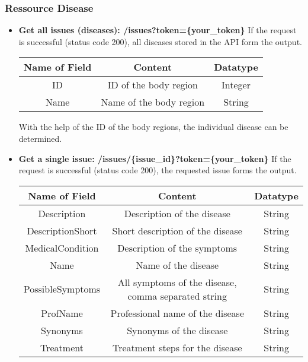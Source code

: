 \subsubsection{Ressource Disease}
\begin{itemize}
	\item \textbf{Get all issues (diseases):  /issues?token=\{your\_token\}}
	\newline
	If the request is successful (status code 200), all diseases stored in the API form the output.
	\begin{center}
		\begin{tabular}{ | c| c| c | } 
			\hline
			Name of Field& Content & Datatype \\ 
			\hline
			ID & ID of the body region & Integer \\ 
			\hline
			Name & Name of the body region & String \\ 
			\hline
		\end{tabular}
	\end{center}
	With the help of the ID of the body regions, the individual disease can be determined.
	\item \textbf{Get a single issue:  /issues/\{issue\_id\}?token=\{your\_token\}}
	\newline
	If the request is successful (status code 200), the requested issue forms the output.
	\begin{center}
		\begin{tabular}{ | c| c| c | } 
			\hline
			Name of Field& Content & Datatype \\ 
			\hline
			Description & Description of the disease & String \\ 
			\hline
			DescriptionShort & Short description of the disease & String \\ 
			\hline
			MedicalCondition & Description of the symptoms & String \\ 
			\hline
			Name & Name of the disease & String \\ 
			\hline
			PossibleSymptoms & All symptoms of the disease, comma separated string & String \\ 
			\hline
			ProfName & Professional name of the disease & String \\ 
			\hline
			Synonyms & Synonyms of the disease & String \\ 
			\hline
			Treatment & Treatment steps for the disease & String \\
			\hline 
		\end{tabular}
	\end{center}
\end{itemize}
